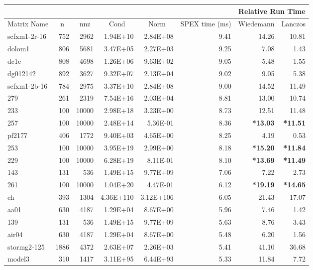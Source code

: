 \documentclass[10pt]{article}
\newcommand{\red}{
	\color{red}	
	}
\begin{document}
\begin{longtable}{|l|r|r|r|r|r|r|r|}
\hline	
& & & & & & \multicolumn{2}{c|}{Relative Run Time}  \\ \hline
\multicolumn{1}{|c|}{Matrix Name}	& \multicolumn{1}{c|}{n} & \multicolumn{1}{c|}{nnz} & \multicolumn{1}{c|}{Cond} & \multicolumn{1}{c|}{Norm} & \multicolumn{1}{c|}{SPEX time (ms)} & \multicolumn{1}{c|}{Wiedemann} & \multicolumn{1}{c|}{Lanczos} \\  \hline \endhead
scfxm1-2r-16	&	752	&	2962	&	1.94E+10	&	2.84E+08	&	9.41	&	14.26	&	10.81	\\
dolom1	&	806	&	5681	&	3.47E+05	&	2.27E+03	&	9.25	&	7.08	&	1.43	\\
dc1c	&	808	&	4698	&	1.26E+06	&	9.63E+02	&	9.05	&	5.48	&	1.55	\\
dg012142	&	892	&	3627	&	9.32E+07	&	2.13E+04	&	9.02	&	9.05	&	5.38	\\
scfxm1-2b-16	&	784	&	2975	&	3.37E+10	&	2.84E+08	&	9.00	&	14.52	&	11.49	\\
279	&	261	&	2319	&	7.54E+16	&	2.03E+04	&	8.81	&	13.00	&	10.74	\\
233	&	100	&	10000	&	2.98E+18	&	3.23E+00	&	8.73	&	12.51	&	11.48	\\
257	&	100	&	10000	&	2.48E+14	&	5.36E-01	&	8.36	&	{\bf \red *13.03}	&	{\bf \red *11.51}	\\
pf2177	&	406	&	1772	&	9.40E+03	&	4.65E+00	&	8.25	&	4.19	&	0.53	\\
253	&	100	&	10000	&	3.95E+19	&	2.99E+00	&	8.18	&	{\bf \red *15.20}	&	{\bf \red *11.84}	\\
229	&	100	&	10000	&	6.28E+19	&	8.11E-01	&	8.10	&	{\bf \red *13.69}	&	{\bf \red *11.49} 	\\
143	&	131	&	536	&	1.49E+15	&	9.77E+09	&	7.06	&	7.22	&	2.73	\\
261	&	100	&	10000	&	1.04E+20	&	4.47E-01	&	6.12	&	{\bf \red *19.19}	&	{\bf \red *14.65}	\\
ch	&	393	&	1304	&	4.36E+110	&	3.12E+106	&	6.05	&	21.43	&	17.07	\\
aa01	&	630	&	4187	&	1.29E+04	&	8.67E+00	&	5.96	&	7.46	&	1.42	\\
139	&	131	&	536	&	1.49E+15	&	9.77E+09	&	5.63	&	8.76	&	3.43	\\
air04	&	630	&	4187	&	1.29E+04	&	8.67E+00	&	5.48	&	6.20	&	1.56	\\
stormg2-125	&	1886	&	4372	&	2.63E+07	&	2.26E+03	&	5.41	&	41.10	&	36.68	\\
model3	&	310	&	1417	&	3.11E+95	&	6.44E+93	&	5.33	&	11.84	&	7.72	\\

\end{longtable}
\end{document}
